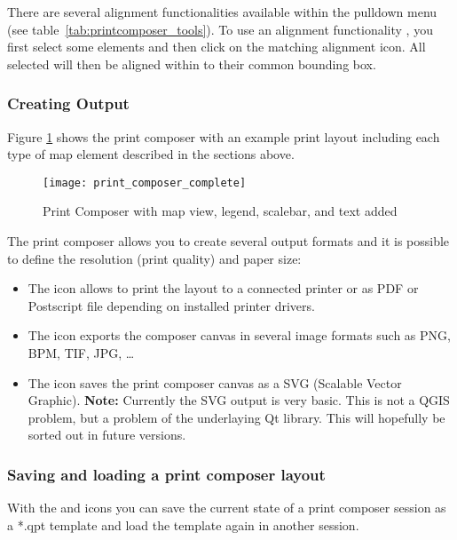There are several alignment functionalities available within the
 pulldown menu (see
table~\ref{tab:printcomposer_tools}). To use an alignment functionality , you
first select some elements and then click on the matching alignment icon. All
selected will then be aligned within to their common bounding box.       

\subsubsection{Creating Output}

Figure \ref{fig:print_composer_complete} shows the print composer with an example 
print layout including each type of map element described in the sections above.

\begin{figure}[h]
   \begin{center}
   \caption{Print Composer with map view, legend, scalebar, and text added \nixcaption}
   \label{fig:print_composer_complete}\smallskip
   \texttt{[image: print\_composer\_complete]}
\end{center}  
\end{figure}

The print composer allows you to create several output formats and it is possible to 
define the resolution (print quality) and paper size:

\begin{itemize}
\item The  icon allows to print the layout 
to a connected printer or as PDF or Postscript file depending on installed printer 
drivers.
\item The  icon exports the 
composer canvas in several image formats such as PNG, BPM, TIF, JPG, \dots
\item The  icon saves the print 
composer canvas as a SVG (Scalable Vector Graphic). \textbf{Note:} Currently the 
SVG output is very basic. This is not a QGIS problem, but a problem of the underlaying 
Qt library. This will hopefully be sorted out in future versions.
\end{itemize}

\subsubsection{Saving and loading a print composer layout}

With the  and
 icons you can save the current
state of a print composer session as a  *.qpt template and load the template
again in another session.

